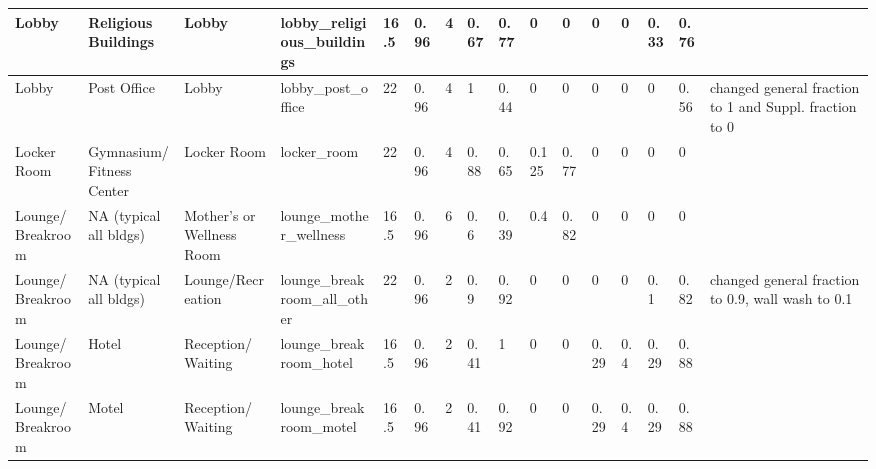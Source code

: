 \begin{center}
\begin{landscape}
\begin{longtable}{|p{0.75in}|p{0.75in}|p{0.75in}|p{0.75in}|p{0.3in}|p{0.3in}|p{0.3in}|p{0.3in}|p{0.3in}|p{0.3in}|p{0.3in}|p{0.3in}|p{0.3in}|p{0.3in}|p{0.3in}|p{0.6in}|}
      Lobby                                   & Religious Buildings         & Lobby                                           & lobby\_religious\_buildings                                     & 16.5 & 0.96 & 4  & 0.67   & 0.77  & 0     & 0     & 0    & 0    & 0.33 & 0.76 &                                                                                       \\ \hline
      Lobby                                   & Post Office                 & Lobby                                           & lobby\_post\_office                                             & 22   & 0.96 & 4  & 1      & 0.44  & 0     & 0     & 0    & 0    & 0    & 0.56 & changed general fraction to 1 and Suppl. fraction to 0                          \\ \hline
      Locker Room                             & Gymnasium/Fitness Center    & Locker Room                                     & locker\_room                                                    & 22   & 0.96 & 4  & 0.88   & 0.65  & 0.125 & 0.77  & 0    & 0    & 0    & 0    &                                                                                       \\ \hline
      Lounge/Breakroom                      & NA (typical all bldgs)      & Mother's or Wellness Room                       & lounge\_mother\_wellness                                        & 16.5 & 0.96 & 6  & 0.6    & 0.39  & 0.4   & 0.82  & 0    & 0    & 0    & 0    &                                                                                       \\ \hline
      Lounge/Breakroom                      & NA (typical all bldgs)      & Lounge/Recreation                               & lounge\_breakroom\_all\_other                                   & 22   & 0.96 & 2  & 0.9    & 0.92  & 0     & 0     & 0    & 0    & 0.1  & 0.82 & changed general fraction to 0.9, wall wash to 0.1                                     \\ \hline
      Lounge/Breakroom                      & Hotel                       & Reception/Waiting                               & lounge\_breakroom\_hotel                                        & 16.5 & 0.96 & 2  & 0.41   & 1     & 0     & 0     & 0.29 & 0.4  & 0.29 & 0.88 &                                                                                       \\ \hline
      Lounge/Breakroom                      & Motel                       & Reception/Waiting                               & lounge\_breakroom\_motel                                        & 16.5 & 0.96 & 2  & 0.41   & 0.92  & 0     & 0     & 0.29 & 0.4  & 0.29 & 0.88 &                                                                                       \\ \hline

\end{longtable}
\end{landscape}
\end{center}
